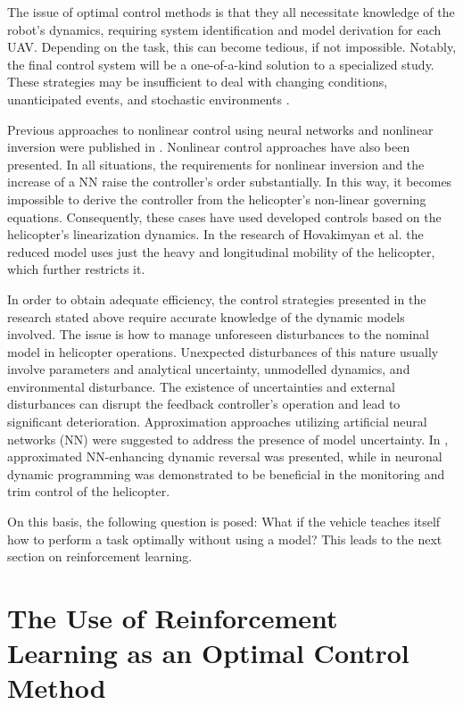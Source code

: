 The issue of optimal control methods is that they all necessitate knowledge of the robot's dynamics, requiring system identification and model derivation for each UAV. Depending on the task, this can become tedious, if not impossible. Notably, the final control system will be a one-of-a-kind solution to a specialized study. These strategies may be insufficient to deal with changing conditions, unanticipated events, and stochastic environments \cite{zhou2019vision}. 

Previous approaches to nonlinear control using neural networks and nonlinear inversion were published in \cite{johnson2005adaptive}. Nonlinear control approaches have also been presented. In all situations, the requirements for nonlinear inversion and the increase of a NN raise the controller's order substantially. In this way, it becomes impossible to derive the controller from the helicopter's non-linear governing equations. Consequently, these cases have used developed controls based on the helicopter's linearization dynamics. In the research of Hovakimyan et al. \cite{hovakimyan2001adaptive} the reduced model uses just the heavy and longitudinal mobility of the helicopter, which further restricts it.

In order to obtain adequate efficiency, the control strategies presented in the research stated above require accurate knowledge of the dynamic models involved. The issue is how to manage unforeseen disturbances to the nominal model in helicopter operations. Unexpected disturbances of this nature usually involve parameters and analytical uncertainty, unmodelled dynamics, and environmental disturbance. The existence of uncertainties and external disturbances can disrupt the feedback controller's operation and lead to significant deterioration. Approximation approaches utilizing artificial neural networks (NN) were suggested to address the presence of model uncertainty. In \cite{kim2004adaptive}, approximated NN-enhancing dynamic reversal was presented, while in \cite{enns2003helicopter} neuronal dynamic programming was demonstrated to be beneficial in the monitoring and trim control of the helicopter. 

On this basis, the following question is posed: What if the vehicle teaches itself how to perform a task optimally without using a model? This leads to the next section on reinforcement learning.

\section{The Use of Reinforcement Learning as an Optimal Control Method} \label{intro_rl}

